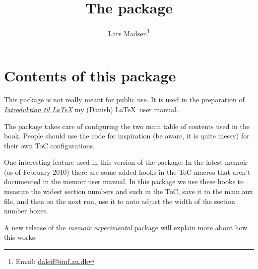 \documentclass[11pt,oneside,a4paper,oldfontcommands,danish,english,article]{memoir}
\theoremstyle{nonumberplain}
\begin{document}
\title{The \textsf{\jobname} package}
\author{Lars Madsen\thanks{Email: \url{daleif@imf.au.dk}}}
\maketitle




\chapter{Contents of this package}

This package is not really meant for public use. It is used in the
preparation of
\emph{\href{http://www.imf.au.dk/system/latex/bog}{Introduktion til
    \LaTeX}} my (Danish) \LaTeX\ user 
manual. 

The package takes care of configuring the two main table of contents
used in the book. People should use the code for inspiration (be
aware, it is quite messy) for their own ToC configurations.

One interesting feature used in this version of the package: In the
latest memoir (as of February 2010) there are some added hooks in the
ToC macros that aren't documented in the memoir user manual. In this
package we use these hooks to measure the widest section numbers and
such in the ToC, save it to the main aux file, and then on the next
run, use it to auto adjust the width of the section number boxes.

A new release of the \emph{memoir experimental} package will explain
more about how this works. 
\end{document}
